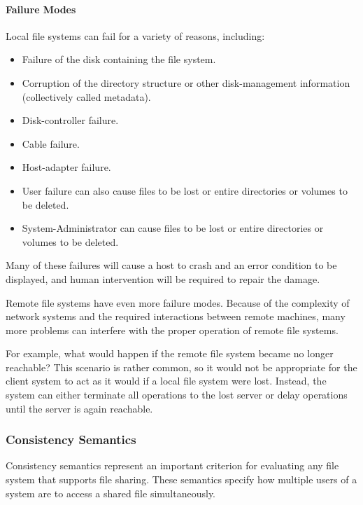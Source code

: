 \paragraph{Failure Modes}\label{par:Failure_Modes}
Local file systems can fail for a variety of reasons, including:
\begin{itemize}[noitemsep]
\item Failure of the disk containing the file system.
\item Corruption of the directory structure or other disk-management information (collectively called metadata).
\item Disk-controller failure.
\item Cable failure.
\item Host-adapter failure.
\item User failure can also cause files to be lost or entire directories or volumes to be deleted.
\item System-Administrator can cause files to be lost or entire directories or volumes to be deleted.
\end{itemize}

Many of these failures will cause a host to crash and an error condition to be displayed, and human intervention will be required to repair the damage.

Remote file systems have even more failure modes.
Because of the complexity of network systems and the required interactions between remote machines, many more problems can interfere with the proper operation of remote file systems.

For example, what would happen if the remote file system became no longer reachable?
This scenario is rather common, so it would not be appropriate for the client system to act as it would if a local file system were lost.
Instead, the system can either terminate all operations to the lost server or delay operations until the server is again reachable.

\subsubsection{Consistency Semantics}\label{subsubsec:Consistency_Semantics}
Consistency semantics represent an important criterion for evaluating any file system that supports file sharing.
These semantics specify how multiple users of a system are to access a shared file simultaneously.


